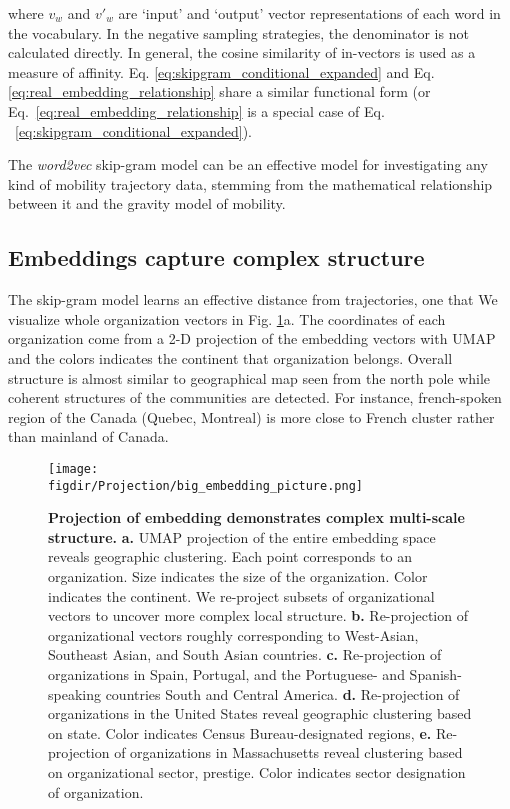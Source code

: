 \documentclass[12pt]{article} %
\def\figdir{../Figs}
\begin{document}
where $v_w$ and $v'_w$ are `input' and `output' vector representations of each word in the vocabulary. In the negative sampling strategies, the denominator is not calculated directly. In general, the cosine similarity of in-vectors is used as a measure of affinity. Eq. \ref{eq:skipgram_conditional_expanded} and Eq. \ref{eq:real_embedding_relationship} share a similar functional form (or Eq.~\ref{eq:real_embedding_relationship} is a special case of Eq. ~\ref{eq:skipgram_conditional_expanded}).

The \textit{word2vec} skip-gram model can be an effective model for investigating any kind of mobility trajectory data, stemming from the mathematical relationship between it and the gravity model of mobility. 


%
%
\subsection*{Embeddings capture complex structure}

The skip-gram model learns an effective distance from trajectories, one that 
We visualize whole organization vectors in  Fig. \ref{fig:projection}a.
The coordinates of each organization come from a 2-D projection of the  embedding vectors with UMAP \cite{mcinnes2018umap} and the colors indicates the continent that organization belongs. Overall structure is almost similar to geographical map seen from the north pole while coherent structures of the communities are detected. For instance, french-spoken region of the Canada (Quebec, Montreal) is more close to French cluster rather than mainland of Canada.
%
%
\begin{figure}[hp!]
	\centering
	\label{fig:projection}
	\texttt{[image: \\figdir/Projection/big\_embedding\_picture.png]}
	\caption{
		\textbf{Projection of embedding demonstrates complex multi-scale structure.}
		\textbf{a.}
		UMAP projection \cite{mcinnes2018umap} of the entire embedding space reveals geographic clustering.
		Each point corresponds to an organization. 
		Size indicates the size of the organization.
		Color indicates the continent. 
		We re-project subsets of organizational vectors to uncover more complex local structure.
		\textbf{b.} Re-projection of organizational vectors roughly corresponding to West-Asian, Southeast Asian, and South Asian countries. 
		\textbf{c.} Re-projection of organizations in Spain, Portugal, and the Portuguese- and Spanish-speaking countries South and Central America. 
		\textbf{d.} Re-projection of organizations in the United States reveal geographic clustering based on state.
		Color indicates Census Bureau-designated regions,
		\textbf{e.} Re-projection of organizations in Massachusetts reveal clustering based on organizational sector, prestige. 
		Color indicates sector designation of organization. 
	}
\end{figure}
\end{document}
